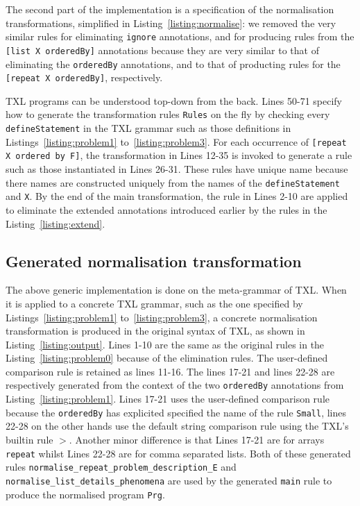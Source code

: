 \documentclass{acm_proc_article-sp}
\begin{document}
The second part of the implementation is a specification of the normalisation transformations, simplified in Listing~\ref{listing:normalise}: we removed the very similar rules for eliminating {\tt ignore} annotations, and for producing rules from the {\tt [list X orderedBy]} annotations because they are very similar to that of eliminating the {\tt orderedBy} annotations, and to that of producting rules for the {\tt [repeat X orderedBy]}, respectively. 

TXL programs can be understood top-down from the back. Lines 50-71 specify how to generate the transformation rules {\tt Rules} on the fly by checking every {\tt defineStatement} in the TXL grammar such as those definitions in Listings~\ref{listing:problem1} to~\ref{listing:problem3}.  For each occurrence of {\tt [repeat X ordered by F]}, the transformation in Lines 12-35 is invoked to generate a rule such as those instantiated in Lines 26-31. These rules have unique name because there names are constructed uniquely from the names of the {\tt defineStatement} and {\tt X}. By the end of the main transformation, the rule in Lines 2-10 are applied to eliminate the extended annotations introduced earlier by the rules in the Listing~\ref{listing:extend}. 

\subsection{Generated normalisation transformation}
The above generic implementation is done on the meta-grammar of TXL. When it is applied to a concrete TXL grammar, such as the one specified by Listings~\ref{listing:problem1} to~\ref{listing:problem3}, a concrete normalisation transformation is produced in the original syntax of TXL, as shown in Listing~\ref{listing:output}. Lines 1-10 are the same as the original rules in the Listing~\ref{listing:problem0} because of the elimination rules. The user-defined comparison rule is retained as lines 11-16. 
The lines 17-21 and lines 22-28 are respectively generated from the context of the two {\tt orderedBy} annotations from Listing~\ref{listing:problem1}. Lines 17-21 uses the user-defined comparison rule because the {\tt orderedBy} has explicited specified the name of the rule {\tt Small}, lines 22-28 on the other hands use the default string comparison rule using the TXL's builtin rule {\tt $>$}. Another minor difference is that Lines 17-21 are for arrays {\tt repeat} whilst Lines 22-28 are for comma separated lists. Both of these generated rules {\tt normalise\_repeat\_problem\_description\_E} and {\tt normalise\_list\_details\_phenomena} are used by the generated {\tt main} rule to produce the normalised program {\tt Prg}. 
\end{document}
